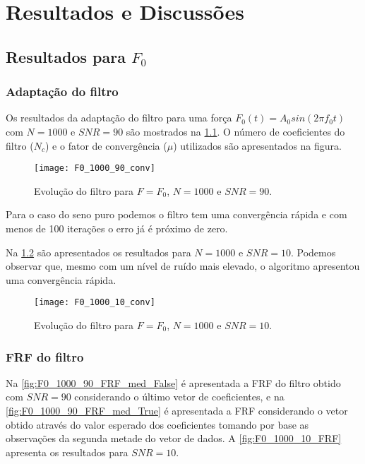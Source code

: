 \chapter{Resultados e Discussões}

\section{Resultados para $ F_0 $}
\subsection{Adaptação do filtro}

Os resultados da adaptação do filtro para uma força $F_0(t) = A_0 sin(2\pi f_0 t)$ com $ N=1000 $  e $ SNR = 90 $ são mostrados na \cref{fig:F0_1000_90_conv}. O número de coeficientes do filtro ($ N_c $) e o fator de convergência ($ \mu $) utilizados são apresentados na figura.

\begin{figure}[!h]
	\centering
	\texttt{[image: F0\_1000\_90\_conv]}
	\caption{Evolução do filtro para $ F=F_0 $, $ N=1000 $ e $ SNR=90 $.}
	\label{fig:F0_1000_90_conv}
\end{figure}

Para o caso do seno puro podemos o filtro tem uma convergência rápida e com menos de 100 iterações o erro já é próximo de zero. 

Na \cref{fig:F0_1000_10_conv} são apresentados os resultados para $ N=1000 $ e $ SNR=10 $. Podemos observar que, mesmo com um nível de ruído mais elevado, o algoritmo apresentou uma convergência rápida.

\begin{figure}
	\centering
	\texttt{[image: F0\_1000\_10\_conv]}
	\caption{Evolução do filtro para $ F=F_0 $, $ N=1000 $ e $ SNR=10 $.}
	\label{fig:F0_1000_10_conv}
\end{figure}

\subsection{FRF do filtro}

Na \cref{fig:F0_1000_90_FRF_med_False} é apresentada a FRF do filtro obtido com $ SNR=90 $ considerando o último vetor de coeficientes, e na \cref{fig:F0_1000_90_FRF_med_True} é apresentada a FRF considerando o vetor obtido através do valor esperado dos coeficientes tomando por base as observações da segunda metade do vetor de dados. A \cref{fig:F0_1000_10_FRF} apresenta os resultados para $ SNR=10 $. 

